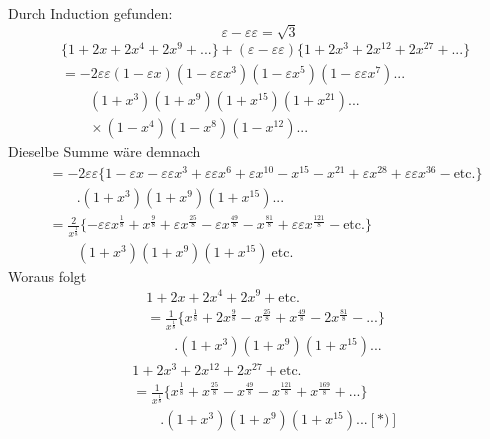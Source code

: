 \begingroup
\makeatletter\tagsleft@true\let\veqno\@@leqno\makeatother
\newcommand{\TransBracket}[1]{\boldsymbol{[}#1\boldsymbol{]}}
\par\indent Durch Induction gefunden:
\[\varepsilon-\varepsilon\varepsilon=\surd3\]
\[\begin{aligned}
&\{1+2x+2x^4+2x^9+{.}{.}{.}\}+(\varepsilon-\varepsilon\varepsilon)\{1+2x^3+2x^{12}+2x^{27}+{.}{.}{.}\}\\
&=-2\varepsilon\varepsilon(1-\varepsilon x)(1-\varepsilon\varepsilon x^3)(1-\varepsilon x^5)(1-\varepsilon\varepsilon x^7){.}{.}{.}\\
&\qquad(1+x^3)(1+x^9)(1+x^{15})(1+x^{21}){.}{.}{.}\\
&\qquad\times(1-x^4)(1-x^8)(1-x^{12}){.}{.}{.}
\end{aligned}\]
\noindent Dieselbe Summe wäre demnach
\[\begin{aligned}
&=-2\varepsilon\varepsilon\{1-\varepsilon x-\varepsilon\varepsilon x^3+\varepsilon\varepsilon x^6+\varepsilon x^{10}-x^{15}-x^{21}+\varepsilon x^{28}+\varepsilon\varepsilon x^{36}-\text{etc.}\}\\
&\qquad.(1+x^3)(1+x^9)(1+x^{15}){.}{.}{.}\\
&=\frac2{x^{\frac18}}\{-\varepsilon\varepsilon x^{\frac18}+x^{\frac98}+\varepsilon x^{\frac{25}8}-\varepsilon x^{\frac{49}8}-x^{\frac{81}8}+\varepsilon\varepsilon x^{\frac{121}8}-\text{etc.}\}\\
&\qquad(1+x^3)(1+x^9)(1+x^{15})\ \text{etc.}
\end{aligned}\]
\clearpage
{}
\noindent Woraus folgt
\begin{equation*}\tag*{1.}
\begin{aligned}
&1+2x+2x^4+2x^9+\text{etc.}\\
&=\frac1{x^{\frac18}}\{x^{\frac18}+2x^{\frac98}-x^{\frac{25}8}+x^{\frac{49}8}-2x^{\frac{81}8}-{.}{.}{.}\}\\
&\qquad.(1+x^3)(1+x^9)(1+x^{15}){.}{.}{.}
\end{aligned}
\end{equation*}
\begin{equation*}\tag*{2.}
\begin{aligned}
&1+2x^3+2x^{12}+2x^{27}+\text{etc.}\\
&=\frac1{x^{\frac18}}\{x^{\frac18}+x^{\frac{25}8}-x^{\frac{49}8}-x^{\frac{121}8}+x^{\frac{169}8}+{.}{.}{.}\}\\
&\qquad.(1+x^3)(1+x^9)(1+x^{15}){.}{.}{.}[\text{*)}]
\end{aligned}
\end{equation*}
